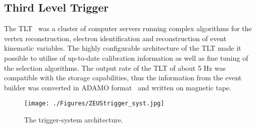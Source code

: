 \subsection{Third Level Trigger}
\label{subsec:tlt}
The TLT~\cite{Bailey:1992iq,Bhadra:1989kz} was a cluster of computer servers running complex algorithms for the vertex reconstruction, electron identification and reconstruction of event kinematic variables. The highly configurable architecture of the TLT made it possible to utilise of up-to-date calibration information as well as fine tuning of the selection algorithms. The output rate of the TLT of about 5 Hz was compatible with the storage capabilities, thus the information from the event builder was converted in ADAMO format~\cite{Hart:1990dz} and written on magnetic tape.

\begin{figure}[h]
	\centering
		\texttt{[image: ./Figures/ZEUStrigger\_syst.jpg]}
	\caption{The \zeus trigger-system architecture.}
	\label{fig:trigarch}
\end{figure}
\newpage
